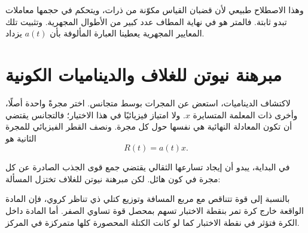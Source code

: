وهذا الاصطلاح طبيعي لأن قضبان القياس مكوّنة من ذرات، ويتحكم في حجمها معاملات تبدو ثابتة. فالمتر هو في نهاية المطاف عدد كبير من الأطوال المجهرية. وتثبيت تلك المعايير المجهرية يعطينا العبارة المألوفة بأن \(a(t)\) يزداد.

\begin{classroomqa}
\end{classroomqa}

\begin{classroomqa}
\end{classroomqa}

\section{مبرهنة نيوتن للغلاف والديناميات الكونية}

لاكتشاف الديناميات، استعض عن المجرات بوسط متجانس. اختر مجرةً واحدة أصلًا، وأخرى ذات المعلمة المتسايرة \(x\). ولا امتياز فيزيائيًا في هذا الاختيار؛ فالتجانس يقتضي أن تكون المعادلة النهائية هي نفسها حول كل مجرة. ونصف القطر الفيزيائي للمجرة الثانية هو
\begin{equation}
  R(t)=a(t)x.
  \label{eq:radius-ax}
\end{equation}

في البداية، يبدو أن إيجاد تسارعها الثقالي يقتضي جمع قوى الجذب الصادرة عن كل مجرة في كون هائل. لكن مبرهنة نيوتن للغلاف تختزل المسألة:

\begin{proposition}
بالنسبة إلى قوة تتناقص مع مربع المسافة وتوزيع كتلي ذي تناظر كروي، فإن المادة الواقعة خارج كرة تمر بنقطة الاختبار تسهم بمحصل قوة تساوي الصفر. أما المادة داخل الكرة فتؤثر في نقطة الاختبار كما لو كانت الكتلة المحصورة كلها متمركزة في المركز.
\end{proposition}

